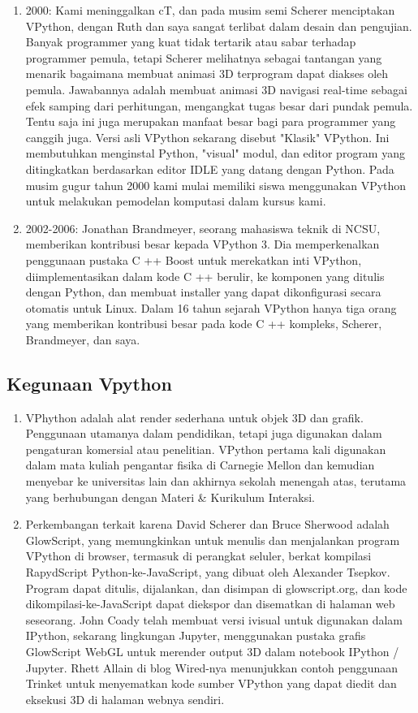 \begin{enumerate}
			\item 2000: Kami meninggalkan cT, dan pada musim semi Scherer menciptakan VPython, dengan Ruth dan saya sangat terlibat dalam desain dan pengujian. Banyak programmer yang kuat tidak tertarik atau sabar terhadap programmer pemula, tetapi Scherer melihatnya sebagai tantangan yang menarik bagaimana membuat animasi 3D terprogram dapat diakses oleh pemula. Jawabannya adalah membuat animasi 3D navigasi real-time sebagai efek samping dari perhitungan, mengangkat tugas besar dari pundak pemula. Tentu saja ini juga merupakan manfaat besar bagi para programmer yang canggih juga. Versi asli VPython sekarang disebut "Klasik" VPython. Ini membutuhkan menginstal Python, "visual" modul, dan editor program yang ditingkatkan berdasarkan editor IDLE yang datang dengan Python. Pada musim gugur tahun 2000 kami mulai memiliki siswa menggunakan VPython untuk melakukan pemodelan komputasi dalam kursus kami.
			\item 2002-2006: Jonathan Brandmeyer, seorang mahasiswa teknik di NCSU, memberikan kontribusi besar kepada VPython 3. Dia memperkenalkan penggunaan pustaka C ++ Boost untuk merekatkan inti VPython, diimplementasikan dalam kode C ++ berulir, ke komponen yang ditulis dengan Python, dan membuat installer yang dapat dikonfigurasi secara otomatis untuk Linux. Dalam 16 tahun sejarah VPython hanya tiga orang yang memberikan kontribusi besar pada kode C ++ kompleks, Scherer, Brandmeyer, dan saya.
		\end{enumerate}
\subsection{Kegunaan Vpython}
		\begin{enumerate}
			\item VPhython adalah alat render sederhana untuk objek 3D dan grafik. Penggunaan utamanya dalam pendidikan, tetapi juga digunakan dalam pengaturan komersial atau penelitian. VPython pertama kali digunakan dalam mata kuliah pengantar fisika di Carnegie Mellon dan kemudian menyebar ke universitas lain dan akhirnya sekolah menengah atas, terutama yang berhubungan dengan Materi & Kurikulum Interaksi.
			\item Perkembangan terkait karena David Scherer dan Bruce Sherwood adalah GlowScript, yang memungkinkan untuk menulis dan menjalankan program VPython di browser, termasuk di perangkat seluler, berkat kompilasi RapydScript Python-ke-JavaScript, yang dibuat oleh Alexander Tsepkov. Program dapat ditulis, dijalankan, dan disimpan di glowscript.org, dan kode dikompilasi-ke-JavaScript dapat diekspor dan disematkan di halaman web seseorang. John Coady telah membuat versi ivisual untuk digunakan dalam IPython, sekarang lingkungan Jupyter, menggunakan pustaka grafis GlowScript WebGL untuk merender output 3D dalam notebook IPython / Jupyter. Rhett Allain di blog Wired-nya menunjukkan contoh penggunaan Trinket untuk menyematkan kode sumber VPython yang dapat diedit dan eksekusi 3D di halaman webnya sendiri.
		\end{enumerate}
